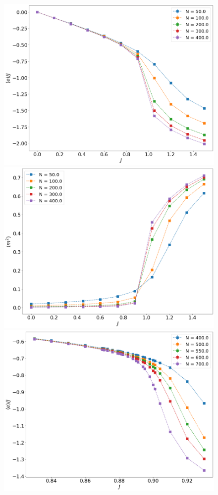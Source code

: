  \begin{figure}[t]
	\centering
	\includegraphics[scale=0.23]{Images/3_energy_shortchains.png}
	\includegraphics[scale=0.23]{Images/3_magnetization2_shortchains.png} \\
	\includegraphics[scale=0.23]{Images/3_energy_longchains.png}

\end{figure}
